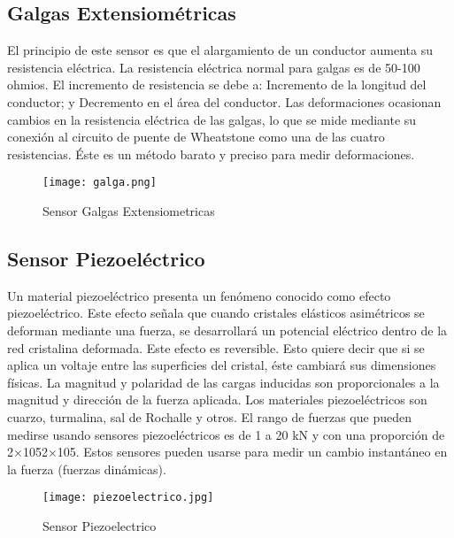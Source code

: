 \subsection*{\quad\textbf{Galgas Extensiométricas}}
El principio de este sensor es que el alargamiento de un conductor aumenta su resistencia eléctrica. La resistencia eléctrica normal para galgas es de 50-100 ohmios. El incremento de resistencia se debe a: Incremento de la longitud del conductor; y Decremento en el área del conductor. Las deformaciones ocasionan cambios en la resistencia eléctrica de las galgas, lo que se mide mediante su conexión al circuito de puente de Wheatstone como una de las cuatro resistencias. Éste es un método barato y preciso para medir deformaciones.

\begin{figure}[h]
	\centering
	\texttt{[image: galga.png]} %
	\caption{Sensor Galgas Extensiometricas}
	\label{fig:ejemplo6}
\end{figure}

\subsection*{\quad\textbf{Sensor Piezoeléctrico}}
Un material piezoeléctrico presenta un fenómeno conocido como efecto piezoeléctrico. Este efecto señala que cuando cristales elásticos asimétricos se deforman mediante una fuerza, se desarrollará un potencial eléctrico dentro de la red cristalina deformada. Este efecto es reversible. Esto quiere decir que si se aplica un voltaje entre las superficies del cristal, éste cambiará sus dimensiones físicas. La magnitud y polaridad de las cargas inducidas son proporcionales a la magnitud y dirección de la fuerza aplicada. Los materiales piezoeléctricos son cuarzo, turmalina, sal de Rochalle y otros. El rango de fuerzas que pueden medirse usando sensores piezoeléctricos es de 1 a 20 kN y con una proporción de 2×1052×105. Estos sensores pueden usarse para medir un cambio instantáneo en la fuerza (fuerzas dinámicas).
\cite{saha2014robotica}

\begin{figure}[h]
	\centering
	\texttt{[image: piezoelectrico.jpg]} %
	\caption{Sensor Piezoelectrico}
	\label{fig:ejemplo7}
\end{figure}
\pagebreak





